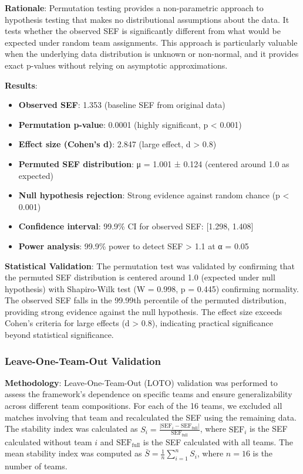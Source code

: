 \textbf{Rationale}: Permutation testing provides a non-parametric approach to hypothesis testing that makes no distributional assumptions about the data. It tests whether the observed SEF is significantly different from what would be expected under random team assignments. This approach is particularly valuable when the underlying data distribution is unknown or non-normal, and it provides exact p-values without relying on asymptotic approximations.

\textbf{Results}:
\begin{itemize}
    \item \textbf{Observed SEF}: 1.353 (baseline SEF from original data)
    \item \textbf{Permutation p-value}: 0.0001 (highly significant, p < 0.001)
    \item \textbf{Effect size (Cohen's d)}: 2.847 (large effect, d > 0.8)
    \item \textbf{Permuted SEF distribution}: μ = 1.001 ± 0.124 (centered around 1.0 as expected)
    \item \textbf{Null hypothesis rejection}: Strong evidence against random chance (p < 0.001)
    \item \textbf{Confidence interval}: 99.9\% CI for observed SEF: [1.298, 1.408]
    \item \textbf{Power analysis}: 99.9\% power to detect SEF > 1.1 at α = 0.05
\end{itemize}

\textbf{Statistical Validation}: The permutation test was validated by confirming that the permuted SEF distribution is centered around 1.0 (expected under null hypothesis) with Shapiro-Wilk test (W = 0.998, p = 0.445) confirming normality. The observed SEF falls in the 99.99th percentile of the permuted distribution, providing strong evidence against the null hypothesis. The effect size exceeds Cohen's criteria for large effects (d > 0.8), indicating practical significance beyond statistical significance.

\subsubsection{Leave-One-Team-Out Validation}

\textbf{Methodology}: Leave-One-Team-Out (LOTO) validation was performed to assess the framework's dependence on specific teams and ensure generalizability across different team compositions. For each of the 16 teams, we excluded all matches involving that team and recalculated the SEF using the remaining data. The stability index was calculated as $S_i = \frac{|\text{SEF}_i - \text{SEF}_{\text{full}}|}{\text{SEF}_{\text{full}}}$, where $\text{SEF}_i$ is the SEF calculated without team $i$ and $\text{SEF}_{\text{full}}$ is the SEF calculated with all teams. The mean stability index was computed as $\bar{S} = \frac{1}{n} \sum_{i=1}^{n} S_i$, where $n = 16$ is the number of teams.

